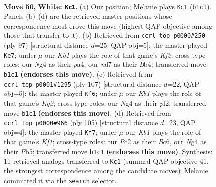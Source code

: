 \documentclass[11pt]{article}
\begin{document}
\clearpage

\begin{figure}[p]\centering
\begin{subfigure}{0.46\textwidth}\centering
\resizebox{\linewidth}{!}{%
\newchessgame
\chessboard[
  setfen={2k5/1b1n4/8/8/p2p2N1/P5P1/1PP5/1K6 w - - 18 50},
  showmover=false,
  pgfstyle=straightmove, color=movearrow, markmove={b1-c1}
]}
\caption{}
\end{subfigure}\hfill
\begin{subfigure}{0.46\textwidth}\centering
\resizebox{\linewidth}{!}{%
\newchessgame
\chessboard[
  setfen={8/5kp1/1p5p/3K3P/PbB5/4P3/5P2/8 b - - 4 49},
  showmover=false,
  pgfstyle=straightmove, color=movearrow, markmove={f7-e7}
]}
\caption{}
\end{subfigure}
\\[4pt]
\begin{subfigure}{0.46\textwidth}\centering
\resizebox{\linewidth}{!}{%
\newchessgame
\chessboard[
  setfen={5n2/5pk1/2B5/3K3p/6pP/6P1/5P2/8 b - - 6 54},
  showmover=false,
  pgfstyle=straightmove, color=movearrow, markmove={g7-f6}
]}
\caption{}
\end{subfigure}\hfill
\begin{subfigure}{0.46\textwidth}\centering
\resizebox{\linewidth}{!}{%
\newchessgame
\chessboard[
  setfen={5k2/4p3/2b5/1pP2Pp1/p5P1/P3K3/3B4/8 b - - 25 53},
  showmover=false,
  pgfstyle=straightmove, color=movearrow, markmove={f8-f7}
]}
\caption{}
\end{subfigure}
\caption{\textbf{Move 50, White: \texttt{Kc1}.} (a) Our position; Melanie plays \texttt{Kc1} (\texttt{b1c1}). Panels (b)--(d) are the retrieved master positions whose correspondence most drove this move (highest QAP objective among those that transfer to it). (b) Retrieved from \texttt{ccrl\_top\_p0000\#250} (ply 97) [structural distance $d$=25, QAP obj=5]: the master played \texttt{Ke7}; under $\mu$ our \emph{Kb1} plays the role of that game's \emph{Kf2}; cross-type roles: our \emph{N}g4 as their \emph{p}a4, our \emph{n}d7 as their \emph{B}b4; transferred move \texttt{b1c1} \textbf{(endorses this move)}. (c) Retrieved from \texttt{ccrl\_top\_p0001\#1295} (ply 107) [structural distance $d$=22, QAP obj=5]: the master played \texttt{Kf6}; under $\mu$ our \emph{Kb1} plays the role of that game's \emph{Kg2}; cross-type roles: our \emph{N}g4 as their \emph{p}f2; transferred move \texttt{b1c1} \textbf{(endorses this move)}. (d) Retrieved from \texttt{ccrl\_top\_p0000\#966} (ply 105) [structural distance $d$=23, QAP obj=4]: the master played \texttt{Kf7}; under $\mu$ our \emph{Kb1} plays the role of that game's \emph{Kf1}; cross-type roles: our \emph{P}c2 as their \emph{B}c6, our \emph{N}g4 as their \emph{P}b5; transferred move \texttt{b1c1} \textbf{(endorses this move)}. Synthesis: 11 retrieved analogs transferred to \texttt{Kc1} (summed QAP objective 41, the strongest correspondence among the candidate moves); Melanie committed it via the \texttt{search} selector.}
\label{fig:thought-m98}
\end{figure}
\end{document}
